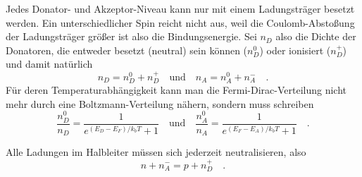 Jedes Donator- und Akzeptor-Niveau kann nur mit einem Ladungsträger besetzt werden. Ein unterschiedlicher Spin reicht nicht aus, weil die Coulomb-Abstoßung der Ladungsträger größer ist also die Bindungsenergie. Sei $n_D$ also die Dichte der Donatoren, die entweder besetzt (neutral) sein können ($n_D^0$) oder ionisiert  ($n_D^+$) und damit natürlich
\begin{equation}
    n_D = n_D^0 + n_D^+ \quad \text{und} \quad   n_A = n_A^0 + n_A^-   \quad .
\end{equation}
Für deren Temperaturabhängigkeit kann man die Fermi-Dirac-Verteilung nicht mehr durch eine Boltzmann-Verteilung nähern, sondern muss schreiben
\begin{equation}
    \frac{n_D^0}{n_D} = \frac{1}{e^{(E_D - E_F)/ k_b T } +1}
    \quad \text{und} \quad 
    \frac{n_A^0}{n_A} = \frac{1}{e^{(E_F - E_A)/ k_b T } +1} \quad .
\end{equation}

Alle Ladungen im Halbleiter müssen sich jederzeit neutralisieren, also 
\begin{equation}
    n + n_A^- = p + n_D^+ \quad .
\end{equation}

